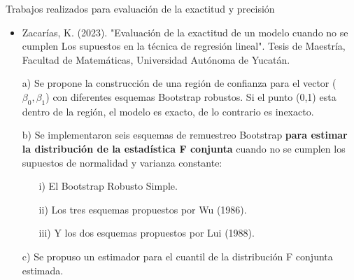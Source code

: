 \documentclass[serif, aspectratio=169]{beamer}
\begin{document}
\begin{frame}{Trabajos realizados para evaluación de la exactitud y precisión}
	
	\begin{itemize}
		\item  Zacarías, K. (2023). "Evaluación de la exactitud de un modelo cuando no se cumplen Los supuestos en la técnica de regresión lineal". Tesis de Maestría, Facultad
		de Matemáticas, Universidad Autónoma de Yucatán.
	\end{itemize}
	
	
	
	\begin{itemize}
		\item [a)] Se propone la construcción de una región de confianza para el vector ($\beta_0 , \beta_{1}$) con diferentes esquemas Bootstrap robustos. Si el punto (0,1) esta dentro de la región, el modelo es exacto, de lo contrario es inexacto.
		 
		\item[ b)] Se implementaron seis esquemas de remuestreo Bootstrap \textbf{para estimar la distribución de la estadística F conjunta} cuando no se cumplen los supuestos de normalidad y varianza constante: 
		
			\begin{itemize}
				\item[ i) ] El Bootstrap Robusto Simple.
				\item[ ii)] Los tres esquemas propuestos por Wu (1986).
				\item[ iii)] Y los dos esquemas propuestos por Lui (1988).
			\end{itemize}
		
		\item[ c)] Se propuso un estimador para el cuantil de la distribución F conjunta estimada.
	\end{itemize}

	
\end{frame}
\end{document}
